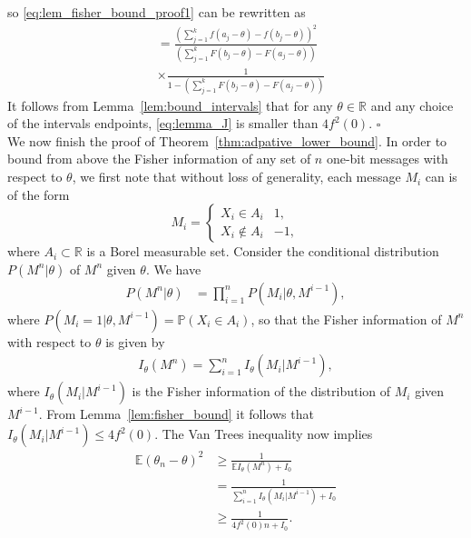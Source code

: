 \documentclass[letterpaper, 11pt]{IEEEtran}      %
\newcommand*{\QEDA}{\hfill\ensuremath{\square}}
\begin{document}
so \eqref{eq:lem_fisher_bound_proof1} can be rewritten as
\begin{align}
& =   \frac { \left( \sum_{j=1}^{k} f \left(a_j-\theta \right) - f \left( b_j-\theta \right)  \right)^2 } 
{ \left( \sum_{j=1}^k F \left( b_j-\theta \right) - F \left( a_j-\theta \right)  \right) }  \nonumber \\
& \times \frac {1} 
{1- \left( \sum_{j=1}^k F \left(  b_j-\theta \right) - F \left( a_j-\theta \right)  \right) } 
\label{eq:lemma_J}
\end{align}
It follows from Lemma~\ref{lem:bound_intervals} that for any $\theta \in \mathbb R$ and any choice of the intervals endpoints, \eqref{eq:lemma_J} is smaller than $4f^2(0)$.  \QEDA \\

We now finish the proof of Theorem~\ref{thm:adpative_lower_bound}. In order to bound from above the Fisher information of any set of $n$ one-bit messages with respect to $\theta$, we first note that without loss of generality, each message $M_i$ can is of the form
\begin{equation}
\label{eq:general_messages}
M_i = \begin{cases}
X_i \in A_i & 1, \\
X_i \notin A_i & -1,
\end{cases} 
\end{equation}
where $A_i \subset \mathbb R$ is a Borel measurable set. 
Consider the conditional distribution $P({M^n|\theta})$ of $M^n$ given $\theta$. We have 
\begin{align}
P\left( M^n | \theta \right) & =  \prod_{i=1}^n P\left(M_i | \theta, M^{i-1} \right), \label{eq:adpt_lower_bound_proof:1}
\end{align}
where $P\left(M_i =1 | \theta, M^{i-1}  \right) = \mathbb P\left( X_i \in A_i\right)$, so that the Fisher information of $M^n$ with respect to $\theta$ is given by 
\begin{align}
I_\theta(M^n) = \sum_{i=1}^n I_\theta (M_i|M^{i-1}),
\label{eq:fisher_information}
\end{align}
where $I_\theta (M_i|M^{i-1})$ is the Fisher information of the distribution of $M_i$ given $M^{i-1}$. From Lemma~\ref{lem:fisher_bound} it follows that $I_\theta (M_i|M^{i-1}) \leq 4f^2(0)$. The Van Trees inequality \cite{van2004detection, gill1995applications} now implies 
\begin{align*}
\mathbb E \left( \theta_n - \theta \right)^2 &  \geq \frac{1}{ \mathbb E I_\theta(M^n) + I_0} \\
& = \frac{1}{ \sum_{i=1}^n I_\theta (M_i | M^{i-1} ) + I_0} \\
& \geq \frac{1}{ 4f^2(0) n + I_0}.
\end{align*}
\end{document}
